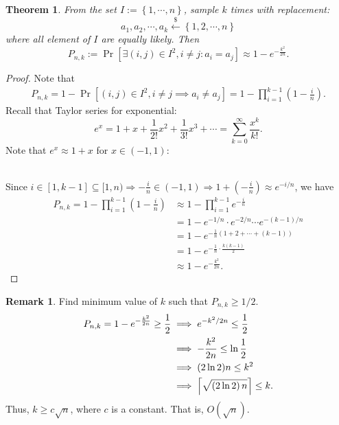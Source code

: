 \documentclass[12pt,openany]{book}
\DeclarePairedDelimiter{\ceil}{\lceil}{\rceil}
\newtheorem{theorem}{Theorem}[chapter]
\theoremstyle{definition}
\newtheorem{remark}{Remark}[chapter]
\newcommand{\set}[1]{\left\{#1\right\}}
\newcommand{\of}[1]{\left( #1 \right)}
\newcommand{\dollar}{\$}
\newcommand{\uniform}{\xleftarrow{\dollar}}
\begin{document}
	\newpage
	\begin{tcolorbox}[colback=white,colframe=thmcolor,arc=5pt,title={\color{white}\bf Birthday Bound}]
		\begin{theorem}
			From the set $I:=\set{1,\cdots,n}$, sample $k$ times with replacement: \[
			a_1,a_2,\cdots,a_k\uniform\set{1,2,\cdots,n}
			\] where all element of $I$ are equally likely. Then \[
			P_{n,k}:=\Pr\left[\exists \of{i,j}\in I^2, i\neq j:a_i=a_j\right]\approx 1-e^{-\frac{k^2}{2n}}.
			\]
		\end{theorem}
	\end{tcolorbox}
	\begin{proof}
		Note that \begin{align*}
		P_{n,k}=1-\Pr[(i,j)\in I^2, i\neq j\implies a_i\neq a_j]=1-\prod_{i=1}^{k-1}\of{1-\frac{i}{n}}.
		\end{align*} Recall that Taylor series for exponential: \[
		e^x=1+x+\frac{1}{2!}x^2+\frac{1}{3!}x^3+\cdots=\sum_{k=0}^{\infty}\frac{x^k}{k!}.
		\] Note that $e^x\approx1+x$ for $x\in(-1,1)$:
		\begin{figure}[ht!]
			\centering
		\end{figure}\\
		Since $i\in[1,k-1]\subseteq[1,n)\Rightarrow-\frac{i}{n}\in\of{-1,1}\Rightarrow 1+\of{-\frac{i}{n}}\approx e^{-i/n}$, we have \begin{align*}
		P_{n,k}=
		1-\prod_{i=1}^{k-1}\of{1-\frac{i}{n}}
		&\approx 1-\prod_{i=1}^{k-1}e^{-\frac{i}{n}}\\
		&=1-e^{-1/n}\cdot e^{-2/n}\cdots e^{-(k-1)/n}\\
		&=1-e^{-\frac{1}{n}\of{1+2+\cdots+(k-1)}}\\
		&=1-e^{-\frac{1}{n}\cdot\frac{k\of{k-1}}{2}}\\
		&\approx 1-e^{-\frac{k^2}{2n}}.
		\end{align*}
	\end{proof}
	
	\begin{remark}
		Find minimum value of $k$ such that $P_{n,k}\geq 1/2$. \begin{align*}
		P_{n,k}=1-e^{-\frac{k^2}{2n}}\geq\frac{1}{2}&\implies e^{-k^2/2n}\leq\frac{1}{2}\\
		&\implies-\frac{k^2}{2n}\leq\ln\frac{1}{2}\\
		&\implies (2\ln2)n\leq k^2\\
		&\implies \ceil*{\sqrt{\of{2\ln 2}n}}\leq k.
		\end{align*} 
		Thus, $k\geq c\sqrt{n}$, where $c$ is a constant. That is, $O(\sqrt{n})$.
	\end{remark}
	
\end{document}
